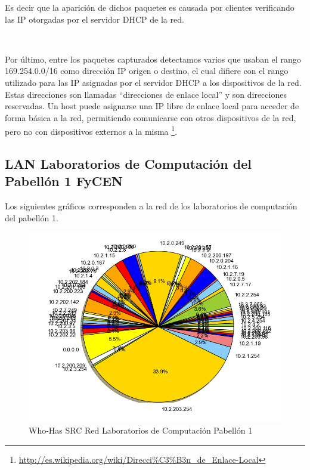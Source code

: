 Es decir que la aparición de dichos paquetes es causada por clientes verificando las IP otorgadas por el servidor DHCP de la red.

~

Por último, entre los paquetes capturados detectamos varios que usaban el rango 169.254.0.0/16 como dirección IP origen o destino, el cual difiere con el rango utilizado para las IP asignadas por el servidor DHCP a los dispositivos de la red. Estas direcciones son llamadas ``direcciones de enlace local'' y son direcciones reservadas. Un host puede asignarse una IP libre de enlace local para acceder de forma básica a la red, permitiendo comunicarse con otros dispositivos de la red, pero no con dispositivos externos a la misma
\footnote{\url{http://es.wikipedia.org/wiki/Direcci\%C3\%B3n_de_Enlace-Local}}.

\clearpage
\newpage
\subsection{LAN Laboratorios de Computación del Pabellón 1 FyCEN}

\indent Los siguientes gráficos corresponden a la red de los laboratorios de computación del pabellón 1.



\begin{center}
	\begin{figure}[ht]
    	\centering
		\includegraphics[width=12cm]{imgs/output_laski_labos_p-arp_who_src-torta.png}
		\caption{Who-Has SRC Red Laboratorios de Computación Pabellón 1}
	\end{figure}
\end{center}

